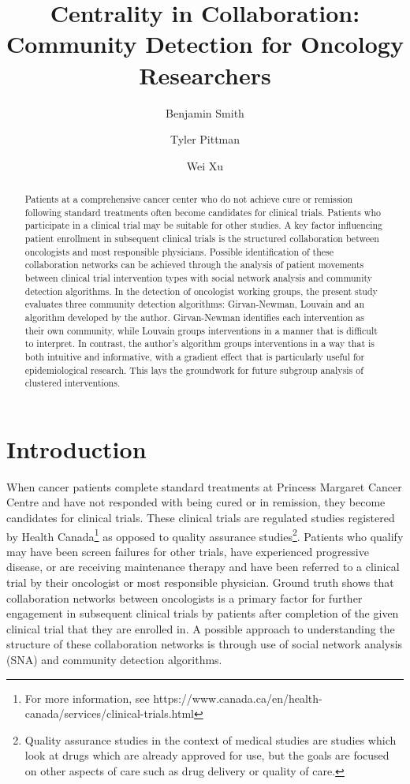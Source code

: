 \documentclass{article}
\title{Centrality in Collaboration: Community Detection for Oncology Researchers}
\author[1]{Benjamin Smith\orcidlink{0009-0007-2206-0177}}
\author[2]{Tyler Pittman\orcidlink{0000-0002-5013-6980}}
\author[1,2]{Wei Xu\orcidlink{0000-0002-0257-8856}}
\affil[1]{University of Toronto, Toronto, Canada}
\affil[2]{University Health Network, Toronto, Canada}
\date{} %
\begin{document}
\maketitle

\begin{abstract}
Patients at a comprehensive cancer center who do not achieve cure
or remission following standard treatments often become candidates for
clinical trials. Patients who participate in a clinical trial may be
suitable for other studies. A key factor influencing patient enrollment
in subsequent clinical trials is the structured collaboration between
oncologists and most responsible physicians. Possible identification of
these collaboration networks can be achieved through the analysis of patient
movements between clinical trial intervention types with
social network analysis and community detection algorithms. In the detection of oncologist working groups, the
present study evaluates three community detection algorithms:
Girvan-Newman, Louvain and an algorithm developed by the author.
Girvan-Newman identifies each intervention as their own community, while
Louvain groups interventions in a manner that is difficult to interpret.
In contrast, the author's algorithm groups interventions in a way that
is both intuitive and informative, with a gradient effect that is particularly useful for epidemiological research. This lays the groundwork for future
subgroup analysis of clustered interventions.
\end{abstract}
\newpage
\section{Introduction}\label{introduction}

When cancer patients complete standard treatments at Princess Margaret
Cancer Centre and have not responded with being cured or in remission,
they become candidates for clinical trials. These clinical trials are
regulated studies registered by Health Canada\footnote{For more
  information, see
  https://www.canada.ca/en/health-canada/services/clinical-trials.html}
as opposed to quality assurance studies\footnote{Quality assurance
  studies in the context of medical studies are studies which look at
  drugs which are already approved for use, but the goals are focused on
  other aspects of care such as drug delivery or quality of care.}.
Patients who qualify may have been screen failures for other trials, have
experienced progressive disease, or are receiving maintenance therapy and
have been referred to a clinical trial by their oncologist or most
responsible physician. Ground truth shows that collaboration networks
between oncologists is a primary factor for further engagement in
subsequent clinical trials by patients after completion of the given
clinical trial that they are enrolled in. A possible approach to
understanding the structure of these collaboration networks is through
use of social network analysis (SNA) and community detection algorithms.
\end{document}
